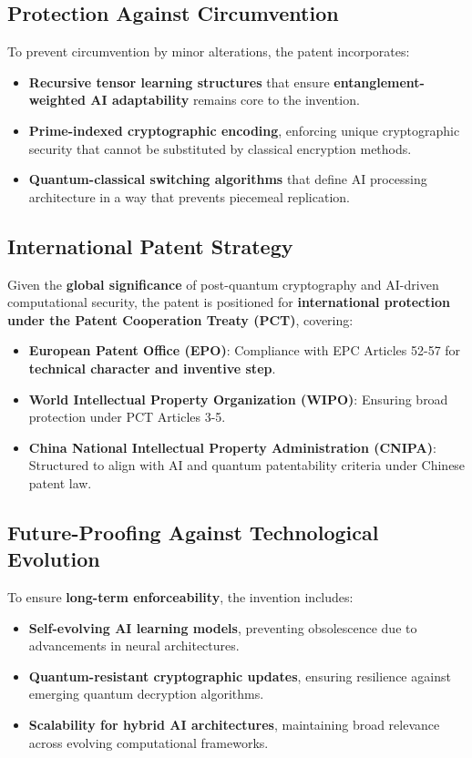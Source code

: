 \documentclass{article}
\theoremstyle{plain}
\begin{document}
\begin{itemize}
\subsection{Protection Against Circumvention}
To prevent circumvention by minor alterations, the patent incorporates:
\begin{itemize}
    \item \textbf{Recursive tensor learning structures} that ensure \textbf{entanglement-weighted AI adaptability} remains core to the invention.
    \item \textbf{Prime-indexed cryptographic encoding}, enforcing unique cryptographic security that cannot be substituted by classical encryption methods.
    \item \textbf{Quantum-classical switching algorithms} that define AI processing architecture in a way that prevents piecemeal replication.
\end{itemize}

\subsection{International Patent Strategy}
Given the \textbf{global significance} of post-quantum cryptography and AI-driven computational security, the patent is positioned for \textbf{international protection under the Patent Cooperation Treaty (PCT)}, covering:
\begin{itemize}
    \item \textbf{European Patent Office (EPO)}: Compliance with EPC Articles 52-57 for \textbf{technical character and inventive step}.
    \item \textbf{World Intellectual Property Organization (WIPO)}: Ensuring broad protection under PCT Articles 3-5.
    \item \textbf{China National Intellectual Property Administration (CNIPA)}: Structured to align with AI and quantum patentability criteria under Chinese patent law.
\end{itemize}

\subsection{Future-Proofing Against Technological Evolution}
To ensure \textbf{long-term enforceability}, the invention includes:
\begin{itemize}
    \item \textbf{Self-evolving AI learning models}, preventing obsolescence due to advancements in neural architectures.
    \item \textbf{Quantum-resistant cryptographic updates}, ensuring resilience against emerging quantum decryption algorithms.
    \item \textbf{Scalability for hybrid AI architectures}, maintaining broad relevance across evolving computational frameworks.
\end{itemize}


\end{itemize}
\end{document}
